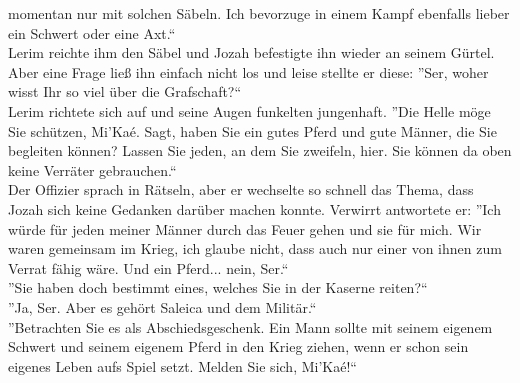 momentan nur mit solchen Säbeln. Ich bevorzuge in einem Kampf ebenfalls lieber ein Schwert oder 
eine Axt.``\\
Lerim reichte ihm den Säbel und Jozah befestigte ihn wieder an seinem Gürtel. Aber eine Frage ließ 
ihn einfach nicht los und leise stellte er diese: ''Ser, woher wisst Ihr so viel über die 
Grafschaft?``\\
Lerim richtete sich auf und seine Augen funkelten jungenhaft. ''Die Helle möge Sie schützen, 
Mi'Kaé. Sagt, haben Sie ein gutes Pferd und gute Männer, die Sie begleiten  können? Lassen Sie 
jeden, an dem Sie zweifeln, hier. Sie können da oben keine Verräter gebrauchen.``\\
Der Offizier sprach in Rätseln, aber er wechselte so schnell das Thema, dass Jozah sich keine 
Gedanken darüber machen konnte. Verwirrt antwortete er: ''Ich würde für jeden meiner Männer durch 
das Feuer gehen und sie für mich. Wir waren gemeinsam im Krieg, ich glaube nicht, dass auch nur 
einer von ihnen zum Verrat fähig wäre. Und ein Pferd... nein, Ser.``\\
''Sie haben doch bestimmt eines, welches Sie in der Kaserne reiten?``\\
''Ja, Ser. Aber es gehört Saleica und dem Militär.``\\
''Betrachten Sie es als Abschiedsgeschenk. Ein Mann sollte mit seinem eigenem Schwert und seinem 
eigenem Pferd in den Krieg ziehen, wenn er schon sein eigenes Leben aufs Spiel setzt. Melden Sie 
sich, Mi'Kaé!`` \\



